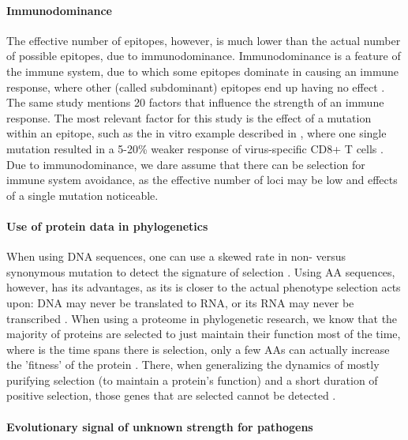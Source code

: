 \paragraph{Immunodominance}

The effective number of epitopes, however,
is much lower than the actual number of possible
epitopes, due to immunodominance. 
Immunodominance is a feature of the immune system,
due to which some epitopes dominate in causing an immune response,
where other (called subdominant) epitopes end up having no 
effect \cite{akram2012immunodominance}.
The same study mentions 20 factors that influence the strength
of an immune response.
The most relevant factor for this study is the effect of
a mutation within an epitope, 
such as the in vitro example described in \cite{berkhoff2004mutation},
where one single mutation resulted in a 5-20\% weaker
response of virus-specific CD8+ T cells .
Due to immunodominance, we dare assume that there can be selection
for immune system avoidance, as the effective number of loci may be
low and effects of a single mutation noticeable.

\paragraph{Use of protein data in phylogenetics}

When using DNA sequences, one can use a skewed rate 
in non- versus synonymous mutation
to detect the signature of selection \cite{murrell2015gene}.
Using AA sequences, however, has its advantages,
as its is closer to the actual phenotype
selection acts upon: DNA may never be translated to RNA,
or its RNA may never be transcribed \cite{diz2012proteomics}
.
When using a proteome in phylogenetic research,
we know that the majority of proteins are selected to just 
maintain their function most of the time, where
is the time spans there is selection, only a few AAs
can actually increase the 'fitness' of the 
protein \cite{anisimova2009investigating}.
There, when generalizing the dynamics of mostly purifying selection (to maintain
a protein's function) and a short duration of positive selection,
those genes that are selected cannot be detected \cite{yang2000statistical}.

\paragraph{Evolutionary signal of unknown strength for pathogens}

